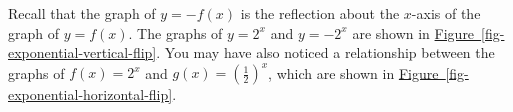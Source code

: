 \documentclass[10pt,]{book}
\theoremstyle{plain}
\theoremstyle{definition}
\theoremstyle{definition}
\theoremstyle{definition}
\theoremstyle{definition}
\theoremstyle{definition}
\numberwithin{equation}{section}
\newcounter{figstack}
\newlength\fight
\newcommand\pushValignCaptionBottom[5][b]{%
\stepcounter{figstack}%
\expandafter\def\csname %
figalign\romannumeral\value{figstack}\endcsname{#1}%
\expandafter\def\csname %
figtype\romannumeral\value{figstack}\endcsname{#2}%
\expandafter\def\csname %
figwd\romannumeral\value{figstack}\endcsname{#3}%
\expandafter\def\csname %
figcontent\romannumeral\value{figstack}\endcsname{#4}%
\expandafter\def\csname %
figcap\romannumeral\value{figstack}\endcsname{#5}%
\setbox0=\hbox{%
\begin{#2}{#3}#4\end{#2}}%
\ifdim\dimexpr\ht0+\dp0\relax>\fight\global\setlength{\fight}{%
\dimexpr\ht0+\dp0\relax}\fi%
}
\begin{document}
	Recall that the graph of \(y = −f (x)\) is the reflection about the \(x\)-axis of the graph of \(y = f (x)\). The graphs of \(y = 2^x\) and \(y = −2^x\) are shown in  \hyperref[fig-exponential-vertical-flip]{Figure~\ref{fig-exponential-vertical-flip}}. You may have also noticed a relationship between the graphs of \(f (x) = 2^x\) and \(g(x) = \left(\frac{1}{2}\right)^x\), which are shown in \hyperref[fig-exponential-horizontal-flip]{Figure~\ref{fig-exponential-horizontal-flip}}.
%
\leavevmode%
\end{document}
